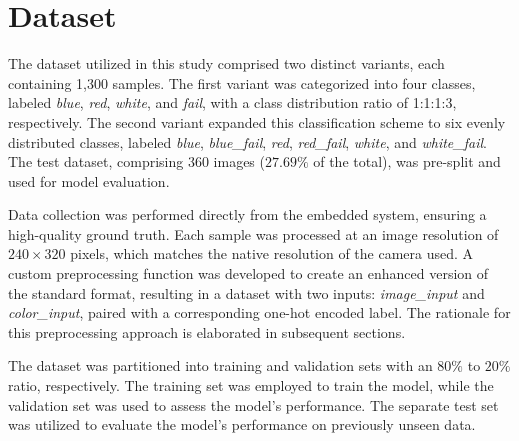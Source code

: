 \documentclass[lettersize,journal]{IEEEtran}
\begin{document}

\section{Dataset}

The dataset utilized in this study comprised two distinct variants, each containing 1,300 samples. The first variant was categorized into four classes, labeled \emph{blue}, \emph{red}, \emph{white}, and \emph{fail}, with a class distribution ratio of 1:1:1:3, respectively. The second variant expanded this classification scheme to six evenly distributed classes, labeled \emph{blue}, \emph{blue\_fail}, \emph{red}, \emph{red\_fail}, \emph{white}, and \emph{white\_fail}. The test dataset, comprising 360 images ($27.69\%$ of the total), was pre-split and used for model evaluation.

Data collection was performed directly from the embedded system, ensuring a high-quality ground truth. Each sample was processed at an image resolution of $240 \times 320$ pixels, which matches the native resolution of the camera used. A custom preprocessing function was developed to create an enhanced version of the standard format, resulting in a dataset with two inputs: \emph{image\_input} and \emph{color\_input}, paired with a corresponding one-hot encoded label. The rationale for this preprocessing approach is elaborated in subsequent sections.

The dataset was partitioned into training and validation sets with an $80\%$ to $20\%$ ratio, respectively. The training set was employed to train the model, while the validation set was used to assess the model's performance. The separate test set was utilized to evaluate the model's performance on previously unseen data.
\end{document}

